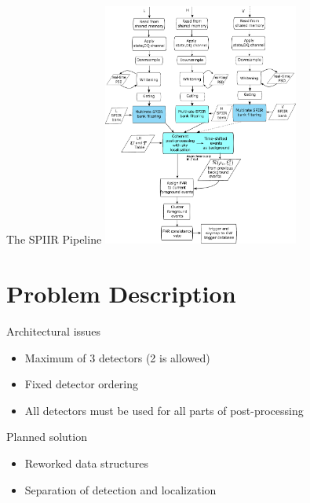 \documentclass{beamer}
\begin{document}
\begin{frame}{The SPIIR Pipeline}
    \centering
    \includegraphics[height=8cm]{online_xdet.jpg}
\end{frame}

\section{Problem Description}
\begin{frame}{Architectural issues}
    \begin{itemize}
        \pause{} \item Maximum of 3 detectors (2 is allowed)
        \pause{} \item Fixed detector ordering
        \pause{} \item All detectors must be used for all parts of
            post-processing
    \end{itemize}
\end{frame}
\begin{frame}{Planned solution}
    \begin{itemize}
        \item Reworked data structures
        \pause{} \item Separation of detection and localization
    \end{itemize}
\end{frame}
\end{document}
